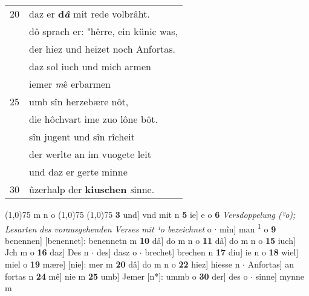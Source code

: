 \documentclass[8pt,a4paper,notitlepage]{article}
\begin{document}
\begin{table}[ht]
\begin{minipage}[t]{0.5\linewidth}
\begin{tabular}{rl}
20 & daz er \textbf{d\textit{â}} mit rede volbrâht.\\ 
 & dô sprach er: "hêrre, ein künic was,\\ 
 & der hiez und heizet noch Anfortas.\\ 
 & daz sol iuch und mich armen\\ 
 & iemer \textit{m}ê erbarmen\\ 
25 & umb sîn herzebære nôt,\\ 
 & die hôchvart ime zuo lône bôt.\\ 
 & sîn jugent und sîn rîcheit\\ 
 & der werlte an im vuogete leit\\ 
 & und daz er gerte minne\\ 
30 & ûzerhalp der \textbf{kiuschen} \textit{s}inne.\\ 
\end{tabular}
\scriptsize
\line(1,0){75} \newline
m n o \newline
\line(1,0){75} \newline
\newline
\line(1,0){75} \newline
\textbf{3} und] vnd mit n \textbf{5} ie] e o \textbf{6} \textit{Versdoppelung (²o); Lesarten des vorausgehenden Verses mit ¹o bezeichnet} o   $\cdot$ mîn] man \textsuperscript{1}\hspace{-1.3mm} o \textbf{9} benennen] [benennet]: benennetn m \textbf{10} dâ] do m n o \textbf{11} dâ] do m n o \textbf{15} iuch] Jch m o \textbf{16} daz] Des n  $\cdot$ des] dasz o  $\cdot$ brechet] brechen n \textbf{17} diu] ie n o \textbf{18} wiel] miel o \textbf{19} mære] [nie]: mer m \textbf{20} dâ] do m n o \textbf{22} hiez] hiesse n  $\cdot$ Anfortas] an fortas n \textbf{24} mê] nie m \textbf{25} umb] Jemer [n*]: ummb o \textbf{30} der] des o  $\cdot$ sinne] mynne m \newline
\end{minipage}
\end{table}
\newpage
\end{document}
